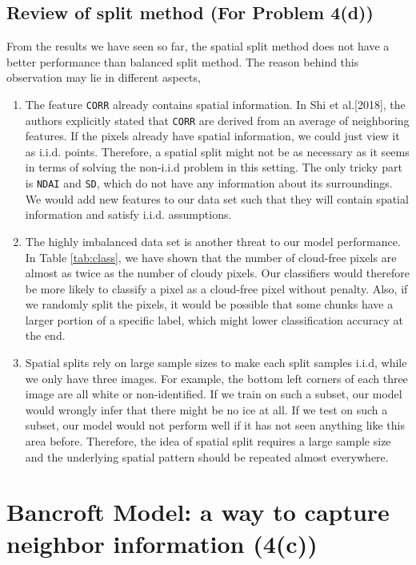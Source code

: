 \documentclass[letterpaper,11pt]{article}
\begin{document}
\subsection{Review of split method (For Problem 4(d))}
From the results we have seen so far, the spatial split method does not have a better performance than balanced split method. The reason behind this observation may lie in different aspects,
\begin{enumerate}
    \item The feature \texttt{CORR} already contains spatial information. In Shi et al.[2018], the authors explicitly stated that \texttt{CORR} are derived from an average of neighboring features. If the pixels already have spatial information, we could just view it as i.i.d. points. Therefore, a spatial split might not be as necessary as it seems in terms of solving the non-i.i.d problem in this setting. The only tricky part is \texttt{NDAI} and \texttt{SD}, which do not have any information about its surroundings. We would add new features to our data set such that they will contain spatial information and satisfy i.i.d. assumptions. 
    \item The highly imbalanced data set is another threat to our model performance. In Table \ref{tab:class}, we have shown that the number of cloud-free pixels are almost as twice as the number of cloudy pixels. Our classifiers would therefore be more likely to classify a pixel as a cloud-free pixel without penalty. Also, if we randomly split the pixels, it would be possible that some chunks have a larger portion of a specific label, which might lower classification accuracy at the end.
    \item Spatial splits rely on large sample sizes to make each split samples i.i.d, while we only have three images. For example, the bottom left corners of each three image are all white or non-identified. If we train on such a subset, our model would wrongly infer that there might be no ice at all. If we test on such a subset, our model would not perform well if it has not seen anything like this area before. Therefore, the idea of spatial split requires a large sample size and the underlying spatial pattern should be repeated almost everywhere.
\end{enumerate}

\section{Bancroft Model: a way to capture neighbor information (4(c))}
\end{document}

